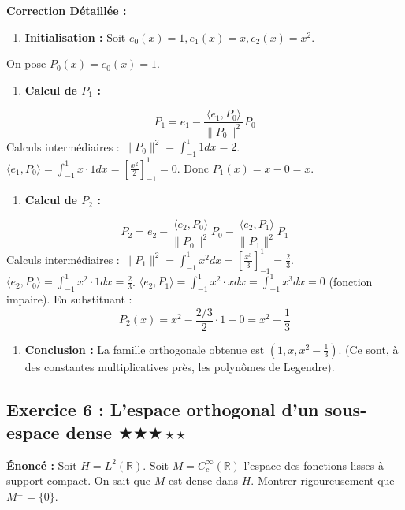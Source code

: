 \documentclass[11pt,a4paper]{article}
\begin{document}
\textbf{Correction Détaillée :}
\begin{enumerate}
\item \textbf{Initialisation :} Soit $e_0(x) = 1, e_1(x) = x, e_2(x) = x^2$.
\end{enumerate}
   On pose $P_0(x) = e_0(x) = 1$.
\begin{enumerate}
\item \textbf{Calcul de $P_1$ :}
\end{enumerate}
   $$ P_1 = e_1 - \frac{\langle e_1, P_0 \rangle}{\|P_0\|^2} P_0 $$
   Calculs intermédiaires :
   $\|P_0\|^2 = \int_{-1}^1 1 dx = 2$.
   $\langle e_1, P_0 \rangle = \int_{-1}^1 x \cdot 1 dx = \left[ \frac{x^2}{2} \right]_{-1}^1 = 0$.
   Donc $P_1(x) = x - 0 = x$.
\begin{enumerate}
\item \textbf{Calcul de $P_2$ :}
\end{enumerate}
   $$ P_2 = e_2 - \frac{\langle e_2, P_0 \rangle}{\|P_0\|^2} P_0 - \frac{\langle e_2, P_1 \rangle}{\|P_1\|^2} P_1 $$
   Calculs intermédiaires :
   $\|P_1\|^2 = \int_{-1}^1 x^2 dx = \left[ \frac{x^3}{3} \right]_{-1}^1 = \frac{2}{3}$.
   $\langle e_2, P_0 \rangle = \int_{-1}^1 x^2 \cdot 1 dx = \frac{2}{3}$.
   $\langle e_2, P_1 \rangle = \int_{-1}^1 x^2 \cdot x dx = \int_{-1}^1 x^3 dx = 0$ (fonction impaire).
   En substituant :
   $$ P_2(x) = x^2 - \frac{2/3}{2} \cdot 1 - 0 = x^2 - \frac{1}{3} $$
\begin{enumerate}
\item \textbf{Conclusion :} La famille orthogonale obtenue est $(1, x, x^2 - \frac{1}{3})$. (Ce sont, à des constantes multiplicatives près, les polynômes de Legendre).
\end{enumerate}



\subsection*{Exercice 6 : L'espace orthogonal d'un sous-espace dense \quad $\bigstar\bigstar\bigstar\star\star$}

\textbf{Énoncé :}
Soit $H = L^2(\mathbb{R})$. Soit $M = C_c^\infty(\mathbb{R})$ l'espace des fonctions lisses à support compact. On sait que $M$ est dense dans $H$. Montrer rigoureusement que $M^\perp = \{0\}$.
\end{document}
